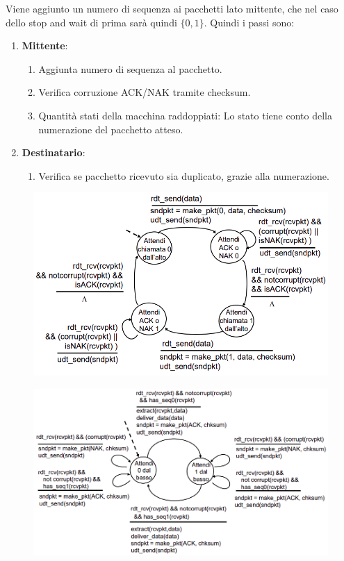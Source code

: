 \documentclass{article}
\begin{document}
Viene aggiunto un numero di sequenza ai pacchetti lato mittente, che nel caso dello stop and wait di prima sarà quindi $\{ 0,1 \}$. Quindi i passi sono:

\begin{enumerate}
    \item \textbf{Mittente}:
    \begin{enumerate}
        \item Aggiunta numero di sequenza al pacchetto.
        \item Verifica corruzione ACK/NAK tramite checksum.
        \item Quantità stati della macchina raddoppiati: Lo stato tiene conto della numerazione del pacchetto atteso.
    \end{enumerate}
    \item \textbf{Destinatario}:
    \begin{enumerate}
        \item Verifica se pacchetto ricevuto sia duplicato, grazie alla numerazione.
    \end{enumerate}
\end{enumerate}

\vspace*{15px}

\begin{figure}[htbp]
    \center
    \includegraphics[scale=0.4]{img/RDT2.1_mittente.png}
\end{figure}

\vspace*{15px}

\begin{figure}[htbp]
    \center
    \includegraphics[scale=0.45]{img/RDT2.1_destinatario.png}
\end{figure}
\end{document}
